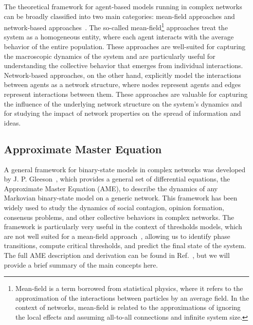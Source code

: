 The theoretical framework for agent-based models running in complex networks can be broadly classified into two main categories: mean-field approaches and network-based approaches~\cite{barrat-2008}. The so-called mean-field\footnote{\sffamily\small Mean-field is a term borrowed from statistical physics, where it refers to the approximation of the interactions between particles by an average field. In the context of networks, mean-field is related to the approximations of ignoring the local effects and assuming all-to-all connections and infinite system size.} approaches treat the system as a homogeneous entity, where each agent interacts with the average behavior of the entire population. These approaches are well-suited for capturing the macroscopic dynamics of the system and are particularly useful for understanding the collective behavior that emerges from individual interactions. Network-based approaches, on the other hand, explicitly model the interactions between agents as a network structure, where nodes represent agents and edges represent interactions between them. These approaches are valuable for capturing the influence of the underlying network structure on the system's dynamics and for studying the impact of network properties on the spread of information and ideas.

\subsection{\label{sec:Approximate Master Equation} Approximate Master Equation}

A general framework for binary-state models in complex networks was developed by J. P. Gleeson~\cite{gleeson-2011,gleeson-2013}, which provides a general set of differential equations, the Approximate Master Equation (AME), to describe the dynamics of any Markovian binary-state model on a generic network. This framework has been widely used to study the dynamics of social contagion, opinion formation, consensus problems, and other collective behaviors in complex networks. The framework is particularly very useful in the context of thresholds models, which are not well suited for a mean-field approach~\cite{gleeson-2007}, allowing us to identify phase transitions, compute critical thresholds, and predict the final state of the system. The full AME description and derivation can be found in Ref.~\cite{gleeson-2013}, but we will provide a brief summary of the main concepts here.

